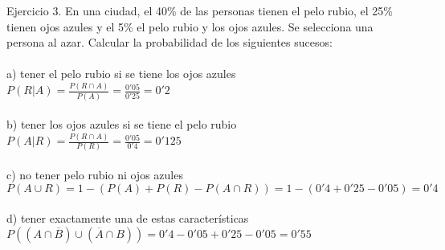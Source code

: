 \documentclass{article}
\begin{document}
Ejercicio 3. En una ciudad, el 40\% de las personas tienen el pelo rubio, el 25\% tienen ojos azules y el 5\% el pelo rubio y los ojos azules. Se selecciona una persona al azar. Calcular la probabilidad de los siguientes sucesos: \\ \\
a) tener el pelo rubio si se tiene los ojos azules \\
$P(R|A) = \frac{P(R \cap A)}{P(A)} = \frac{0'05}{0'25} = 0'2$ \\ \\
b) tener los ojos azules si se tiene el pelo rubio \\
$P(A|R) = \frac{P(R \cap A)}{P(R)} = \frac{0'05}{0'4} = 0'125$ \\ \\
c) no tener pelo rubio ni ojos azules \\ 
$P(A \cup R) = 1 - (P(A)+P(R)-P(A\cap R)) = 1 - (0'4+0'25-0'05) = 0'4 $ \\ \\
d) tener exactamente una de estas características \\
$P((A\cap \overline{B}) \cup (\overline{A} \cap B)) = 0'4 - 0'05 + 0'25 - 0'05 = 0'55 $ \\ 
\end{document}
